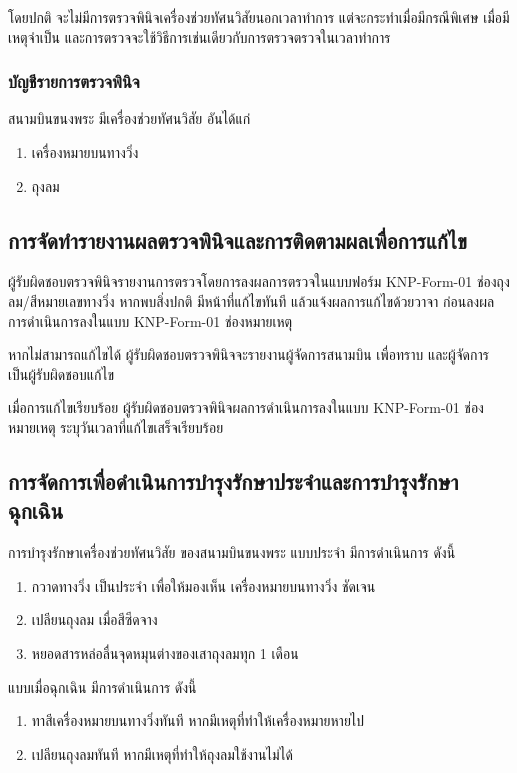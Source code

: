 โดยปกติ จะไม่มีการตรวจพินิจเครื่องช่วยทัศนวิสัยนอกเวลาทำการ แต่จะกระทำเมื่อมีกรณีพิเศษ เมื่อมีเหตุจำเป็น และการตรวจจะใช้วิธีการเช่นเดียวกับการตรวจตรวจในเวลาทำการ

\subsubsection{บัญชีรายการตรวจพินิจ}

สนามบินขนงพระ มีเครื่องช่วยทัศนวิสัย  อันได้แก่

\begin{enumerate}
\item เครื่องหมายบนทางวิ่ง
\item ถุงลม
\end{enumerate}

\subsection{การจัดทำรายงานผลตรวจพินิจและการติดตามผลเพื่อการแก้ไข}

ผู้รับผิดชอบตรวจพินิจรายงานการตรวจโดยการลงผลการตรวจในแบบฟอร์ม KNP-Form-01 ช่องถุงลม/สีหมายเลขทางวิ่ง    หากพบสิ่งปกติ มีหน้าที่แก้ไขทันที   แล้วแจ้งผลการแก้ไขด้วยวาจา ก่อนลงผลการดำเนินการลงในแบบ KNP-Form-01 ช่องหมายเหตุ

หากไม่สามารถแก้ไขได้  ผู้รับผิดชอบตรวจพินิจจะรายงานผู้จัดการสนามบิน เพื่อทราบ และผู้จัดการ เป็นผู้รับผิดชอบแก้ไข

เมื่อการแก้ไขเรียบร้อย ผู้รับผิดชอบตรวจพินิจผลการดำเนินการลงในแบบ KNP-Form-01 ช่องหมายเหตุ ระบุวันเวลาที่แก้ไขเสร็จเรียบร้อย

\subsection{การจัดการเพื่อดำเนินการบำรุงรักษาประจำและการบำรุงรักษาฉุกเฉิน}

การบำรุงรักษาเครื่องช่วยทัศนวิสัย ของสนามบินขนงพระ แบบประจำ มีการดำเนินการ ดังนี้

\begin{enumerate}
\item กวาดทางวิ่ง เป็นประจำ เพื่อให้มองเห็น เครื่องหมายบนทางวิ่ง ชัดเจน
\item เปลียนถุงลม เมื่อสีซีดจาง
\item หยอดสารหล่อลื่นจุดหมุนต่างของเสาถุงลมทุก 1 เดือน
\end{enumerate}

แบบเมื่อฉุกเฉิน มีการดำเนินการ ดังนี้

\begin{enumerate}
\item ทาสีเครื่องหมายบนทางวิ่งทันที หากมีเหตุที่ทำให้เครื่องหมายหายไป
\item เปลียนถุงลมทันที หากมีเหตุที่ทำให้ถุงลมใช้งานไม่ได้
\end{enumerate}


